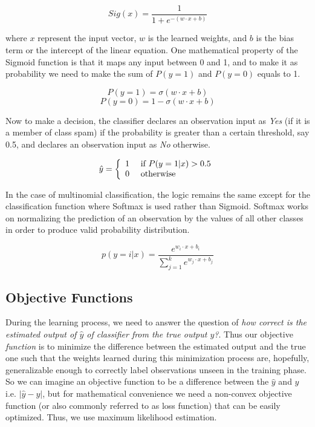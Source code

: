 $$Sig ( x ) = \frac { 1 } { 1 + e ^ { - (w \cdot x +b)} }$$ 

where $x$ represent the input vector, $w$ is the learned weights, and $b$ is the bias term or the intercept of the linear equation. One mathematical property of the Sigmoid function is that it maps any input between 0 and 1, and to make it as probability we need to make the sum of $P(y=1)$ and $P(y=0)$ equals to 1. 

$$ P ( y = 1 ) = \sigma ( w \cdot x + b ) $$
$$ P ( y = 0 ) = 1 - \sigma ( w \cdot x + b ) $$

Now to make a decision, the classifier declares an observation input as \emph{Yes} (if it is a member of class spam) if the probability is greater than a certain threshold, say 0.5, and declares an observation input as \emph{No} otherwise. 

$$  \hat { y } = \left\{ \begin{array} { l l } { 1 } & { \text { if } P ( y = 1 | x ) > 0.5 } \\ { 0 } & { \text { otherwise } } \end{array} \right.  $$


In the case of multinomial classification, the logic remains the same except for the classification function where Softmax is used rather than Sigmoid. Softmax works on normalizing the prediction of an observation by the values of all other classes in order to produce valid probability distribution. 

$$p ( y = i | x ) = \frac { e ^ { w _ { i } \cdot x + b _ { i } } } { \sum _ { j = 1 } ^ { k } e ^ { w _ { j } \cdot x + b _ { j } } }$$



\subsection{Objective Functions}

During the learning process, we need to answer the question of \emph{how correct is the estimated output of $\hat{y}$ of classifier from the true output $y$?}. Thus our objective \emph{function} is to minimize the difference between the estimated output and the true one such that the weights learned during this minimization process are, hopefully,  generalizable enough to correctly label observations unseen in the training phase. So we can imagine an objective function to be a difference between the $\hat{y}$ and $y$ i.e. $\left | \hat{y} - y \right |$, but for mathematical convenience we need a non-convex objective function (or also commonly referred to as loss function)  that can be easily optimized. Thus, we use maximum likelihood estimation. 

